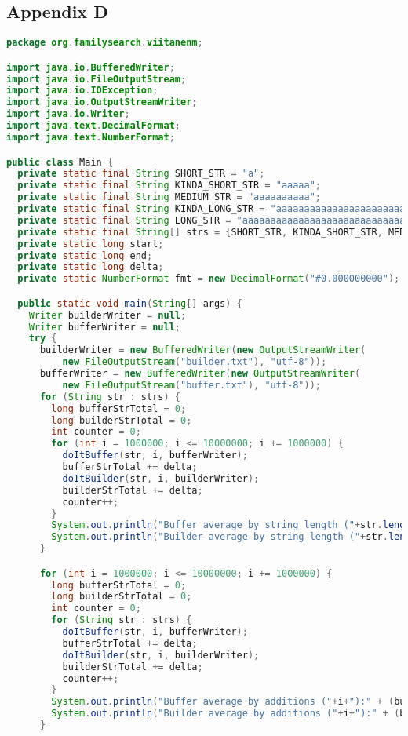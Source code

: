 \subsection*{Appendix D} \label{App:AppendixD}
\begin{lstlisting}[language=Java]
package org.familysearch.viitanenm;

import java.io.BufferedWriter;
import java.io.FileOutputStream;
import java.io.IOException;
import java.io.OutputStreamWriter;
import java.io.Writer;
import java.text.DecimalFormat;
import java.text.NumberFormat;

public class Main {
  private static final String SHORT_STR = "a";
  private static final String KINDA_SHORT_STR = "aaaaa";
  private static final String MEDIUM_STR = "aaaaaaaaaa";
  private static final String KINDA_LONG_STR = "aaaaaaaaaaaaaaaaaaaaaaaaa";
  private static final String LONG_STR = "aaaaaaaaaaaaaaaaaaaaaaaaaaaaaaaaaaaaaaaaaaaaaaaaaa";
  private static final String[] strs = {SHORT_STR, KINDA_SHORT_STR, MEDIUM_STR, KINDA_LONG_STR, LONG_STR};
  private static long start;
  private static long end;
  private static long delta;
  private static NumberFormat fmt = new DecimalFormat("#0.000000000");

  public static void main(String[] args) {
    Writer builderWriter = null;
    Writer bufferWriter = null;
    try {
      builderWriter = new BufferedWriter(new OutputStreamWriter(
          new FileOutputStream("builder.txt"), "utf-8"));
      bufferWriter = new BufferedWriter(new OutputStreamWriter(
          new FileOutputStream("buffer.txt"), "utf-8"));
      for (String str : strs) {
        long bufferStrTotal = 0;
        long builderStrTotal = 0;
        int counter = 0;
        for (int i = 1000000; i <= 10000000; i += 1000000) {
          doItBuffer(str, i, bufferWriter);
          bufferStrTotal += delta;
          doItBuilder(str, i, builderWriter);
          builderStrTotal += delta;
          counter++;
        }
        System.out.println("Buffer average by string length ("+str.length()+"):" + (bufferStrTotal/counter));
        System.out.println("Builder average by string length ("+str.length()+"):" + (builderStrTotal/counter));
      }

      for (int i = 1000000; i <= 10000000; i += 1000000) {
        long bufferStrTotal = 0;
        long builderStrTotal = 0;
        int counter = 0;
        for (String str : strs) {
          doItBuffer(str, i, bufferWriter);
          bufferStrTotal += delta;
          doItBuilder(str, i, builderWriter);
          builderStrTotal += delta;
          counter++;
        }
        System.out.println("Buffer average by additions ("+i+"):" + (bufferStrTotal/counter));
        System.out.println("Builder average by additions ("+i+"):" + (builderStrTotal/counter));
      }


\end{lstlisting}
